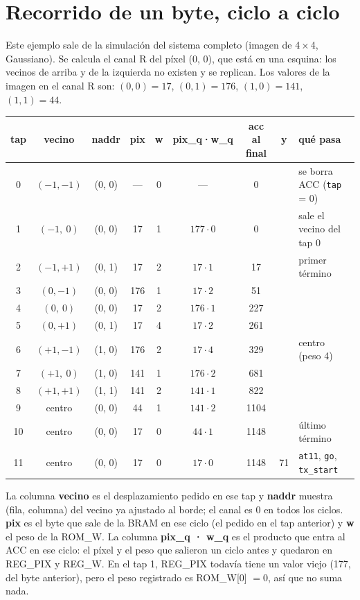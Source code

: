 \documentclass[11pt,a4paper]{article}
\newcommand{\sig}[1]{\texttt{\color{azul}#1}}
\newcommand{\bus}[1]{\texttt{#1}}
\begin{document}
\section{Recorrido de un byte, ciclo a ciclo}

Este ejemplo sale de la simulación del sistema completo (imagen de 4\,×\,4, Gaussiano). Se calcula el canal R del píxel (0, 0), que está en una esquina: los vecinos de arriba y de la izquierda no existen y se replican.
Los valores de la imagen en el canal R son: $(0,0) = 17$, $(0,1) = 176$, $(1,0) = 141$, $(1,1) = 44$.

\begin{center}
\footnotesize
\begin{tabularx}{\linewidth}{ccccccccX}
\toprule
\textbf{tap} & \textbf{vecino} & \textbf{naddr} & \textbf{pix} & \textbf{w} & \textbf{pix\_q·w\_q} & \textbf{acc al final} & \textbf{y} & \textbf{qué pasa} \\
\midrule
0 & $(-1,-1)$ & (0, 0) & — & 0 & — & 0 & & se borra ACC (\bus{tap} = 0) \\
1 & $(-1,\ 0)$ & (0, 0) & 17 & 1 & $177 \cdot 0$ & 0 & & sale el vecino del tap 0 \\
2 & $(-1,+1)$ & (0, 1) & 17 & 2 & $17 \cdot 1$ & 17 & & primer término \\
3 & $(0,-1)$ & (0, 0) & 176 & 1 & $17 \cdot 2$ & 51 & & \\
4 & $(0,\ 0)$ & (0, 0) & 17 & 2 & $176 \cdot 1$ & 227 & & \\
5 & $(0,+1)$ & (0, 1) & 17 & 4 & $17 \cdot 2$ & 261 & & \\
6 & $(+1,-1)$ & (1, 0) & 176 & 2 & $17 \cdot 4$ & 329 & & centro (peso 4) \\
7 & $(+1,\ 0)$ & (1, 0) & 141 & 1 & $176 \cdot 2$ & 681 & & \\
8 & $(+1,+1)$ & (1, 1) & 141 & 2 & $141 \cdot 1$ & 822 & & \\
9 & centro & (0, 0) & 44 & 1 & $141 \cdot 2$ & 1104 & & \\
10 & centro & (0, 0) & 17 & 0 & $44 \cdot 1$ & 1148 & & último término \\
11 & centro & (0, 0) & 17 & 0 & $17 \cdot 0$ & 1148 & 71 & \sig{at11}, \sig{go}, \sig{tx\_start} \\
\bottomrule
\end{tabularx}
\end{center}
La columna \textbf{vecino} es el desplazamiento pedido en ese tap y \textbf{naddr} muestra (fila, columna) del vecino ya ajustado al borde; el canal es 0 en todos los ciclos. \textbf{pix} es el byte que sale de la BRAM en ese ciclo (el pedido en el tap anterior) y \textbf{w} el peso de la ROM\_W. La columna \textbf{pix\_q · w\_q} es el producto que entra al ACC en ese ciclo: el píxel y el peso que salieron un ciclo antes y quedaron en REG\_PIX y REG\_W. En el tap 1, REG\_PIX todavía tiene un valor viejo (177, del byte anterior), pero el peso registrado es ROM\_W[0] $= 0$, así que no suma nada.
\end{document}
